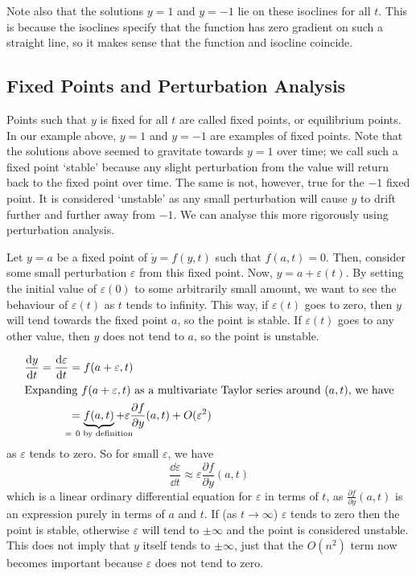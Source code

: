 Note also that the solutions $y = 1$ and $y = -1$ lie on these isoclines for all $t$. This is because the isoclines specify that the function has zero gradient on such a straight line, so it makes sense that the function and isocline coincide.

\subsection{Fixed Points and Perturbation Analysis}
Points such that $y$ is fixed for all $t$ are called fixed points, or equilibrium points. In our example above, $y=1$ and $y=-1$ are examples of fixed points. Note that the solutions above seemed to gravitate towards $y=1$ over time; we call such a fixed point `stable' because any slight perturbation from the value will return back to the fixed point over time. The same is not, however, true for the $-1$ fixed point. It is considered `unstable' as any small perturbation will cause $y$ to drift further and further away from $-1$. We can analyse this more rigorously using perturbation analysis.

Let $y = a$ be a fixed point of $\dot y = f(y, t)$ such that $f(a, t) = 0$. Then, consider some small perturbation $\varepsilon$ from this fixed point. Now, $y = a + \varepsilon(t)$. By setting the initial value of $\varepsilon(0)$ to some arbitrarily small amount, we want to see the behaviour of $\varepsilon(t)$ as $t$ tends to infinity. This way, if $\varepsilon(t)$ goes to zero, then $y$ will tend towards the fixed point $a$, so the point is stable. If $\varepsilon(t)$ goes to any other value, then $y$ does not tend to $a$, so the point is unstable.

\begin{align*}
	\frac{\dd{y}}{\dd{t}} = \frac{\dd \varepsilon}{\dd{t}} & = f(a + \varepsilon, t)                                                                                                            \\
	\intertext{Expanding $f(a + \varepsilon, t)$ as a multivariate Taylor series around $(a, t)$, we have}
	                                                       & = \underbrace{f(a, t)}_{\mathclap{=\ 0\text{ by definition}}} + \varepsilon \frac{\partial f}{\partial y}(a, t) + O(\varepsilon^2)
\end{align*}
as $\varepsilon$ tends to zero. So for small $\varepsilon$, we have
\[ \frac{\dd \varepsilon}{\dd{t}} \approx \varepsilon \frac{\partial f}{\partial y}(a, t) \]
which is a linear ordinary differential equation for $\varepsilon$ in terms of $t$, as $\frac{\partial f}{\partial y}(a, t)$ is an expression purely in terms of $a$ and $t$. If (as $t \to \infty$) $\varepsilon$ tends to zero then the point is stable, otherwise $\varepsilon$ will tend to $\pm \infty$ and the point is considered unstable. This does not imply that $y$ itself tends to $\pm \infty$, just that the $O(n^2)$ term now becomes important because $\varepsilon$ does not tend to zero.

